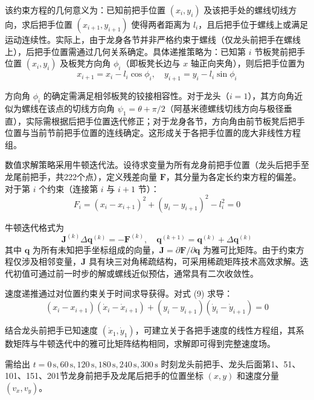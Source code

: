 \documentclass{mcmthesis}
\begin{document}
该约束方程的几何意义为：已知前把手位置 $(x_i, y_i)$ 及该把手处的螺线切线方向，求后把手位置 $(x_{i+1}, y_{i+1})$ 使得两者距离为 $l_i$，且后把手位于螺线上或满足运动连续性。实际上，由于龙身各节并非严格约束于螺线（仅龙头前把手在螺线上），后把手位置需通过几何关系确定。具体递推策略为：已知第 $i$ 节板凳前把手位置 $(x_i, y_i)$ 及板凳方向角 $\phi_i$（即板凳长边与 $x$ 轴正向夹角），则后把手位置为
\begin{equation}
x_{i+1} = x_i - l_i\cos\phi_i, \quad y_{i+1} = y_i - l_i\sin\phi_i
\end{equation}

方向角 $\phi_i$ 的确定需满足相邻板凳的铰接相容性。对于龙头（$i=1$），其方向角近似为螺线在该点的切线方向角 $\psi_1 = \theta + \pi/2$（阿基米德螺线切线方向与极径垂直），实际需根据后把手位置迭代修正；对于龙身各节，方向角由前节板凳后把手位置与当前节前把手位置的连线确定。这形成关于各把手位置的庞大非线性方程组。

数值求解策略采用牛顿迭代法。设待求变量为所有龙身前把手位置（龙头后把手至龙尾前把手，共222个点），定义残差向量 $\boldsymbol{F}$，其分量为各定长约束方程的偏差。对于第 $i$ 个约束（连接第 $i$ 与 $i+1$ 节）：
\begin{equation}
F_i = (x_i - x_{i+1})^2 + (y_i - y_{i+1})^2 - l_i^2 = 0
\end{equation}

牛顿迭代格式为
\begin{equation}
\boldsymbol{J}^{(k)}\Delta\boldsymbol{q}^{(k)} = -\boldsymbol{F}^{(k)}, \quad \boldsymbol{q}^{(k+1)} = \boldsymbol{q}^{(k)} + \Delta\boldsymbol{q}^{(k)}
\end{equation}
其中 $\boldsymbol{q}$ 为所有未知把手坐标组成的向量，$\boldsymbol{J} = \partial\boldsymbol{F}/\partial\boldsymbol{q}$ 为雅可比矩阵。由于约束方程仅涉及相邻变量，$\boldsymbol{J}$ 具有块三对角稀疏结构，可采用稀疏矩阵技术高效求解。迭代初值可通过前一时步的解或螺线近似预估，通常具有二次收敛性。

速度递推通过对位置约束关于时间求导获得。对式 (9) 求导：
\begin{equation}
(x_i - x_{i+1})(\dot{x}_i - \dot{x}_{i+1}) + (y_i - y_{i+1})(\dot{y}_i - \dot{y}_{i+1}) = 0
\end{equation}

结合龙头前把手已知速度 $(\dot{x}_1, \dot{y}_1)$，可建立关于各把手速度的线性方程组，其系数矩阵与牛顿迭代中的雅可比矩阵结构相同，求解即可得到完整速度场。

需给出 $t = 0\,\text{s}, 60\,\text{s}, 120\,\text{s}, 180\,\text{s}, 240\,\text{s}, 300\,\text{s}$ 时刻龙头前把手、龙头后面第1、51、101、151、201节龙身前把手及龙尾后把手的位置坐标 $(x, y)$ 和速度分量 $(v_x, v_y)$。
\end{document}
